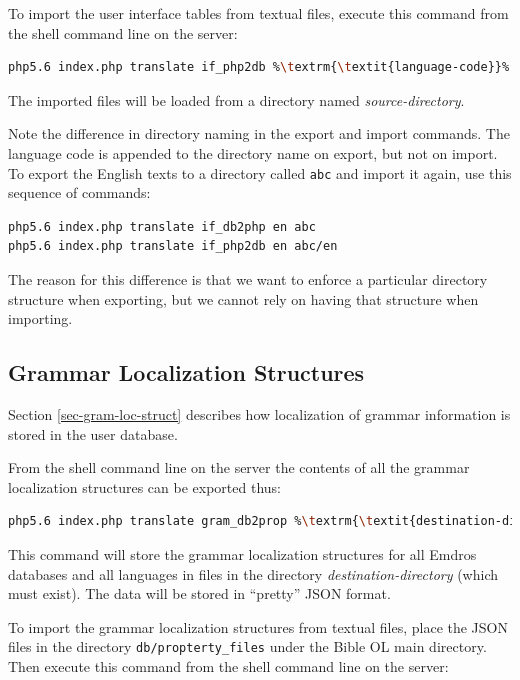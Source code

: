 \documentclass[11pt,oneside,a4paper]{memoir}
\begin{document}
To import the user interface tables from textual files, execute this command from the shell command
line on the server:

\begin{lstlisting}[language=bash,basicstyle={\ttfamily}]
php5.6 index.php translate if_php2db %\textrm{\textit{language-code}}% %\textrm{\textit{source-directory}}%
\end{lstlisting}

The imported files will be loaded from a directory named \emph{source-directory}.

Note the difference in directory naming in the export and import commands. The language code is
appended to the directory name on export, but not on import. To export the English
texts to a directory called \texttt{abc} and import it again, use this sequence of commands:

\begin{lstlisting}[language=bash,basicstyle={\ttfamily}]
php5.6 index.php translate if_db2php en abc
php5.6 index.php translate if_php2db en abc/en
\end{lstlisting}

The reason for this difference is that we want to enforce a particular directory structure when
exporting, but we cannot rely on having that structure when importing.

\subsection{Grammar Localization Structures}

Section \ref{sec-gram-loc-struct} describes how localization of grammar information is stored in the
user database.

From the shell command line on the server the contents of all the grammar localization structures can be exported
thus:

\begin{lstlisting}[language=bash,basicstyle={\ttfamily}]
php5.6 index.php translate gram_db2prop %\textrm{\textit{destination-directory}}%
\end{lstlisting}

This command will store the grammar localization structures for all Emdros databases and all
languages in files in the directory \emph{destination-directory} (which must exist). The data will
be stored in ``pretty'' JSON format.

To import the grammar localization structures from textual files, place the JSON files in the directory
\texttt{db/propterty\_files} under the Bible OL main directory. Then execute this command from the
shell command line on the server:
\end{document}
